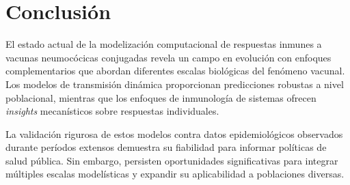 

\section{Conclusión}

El estado actual de la modelización computacional de respuestas inmunes a vacunas neumocócicas conjugadas revela un campo en evolución con enfoques complementarios que abordan diferentes escalas biológicas del fenómeno vacunal. Los modelos de transmisión dinámica proporcionan predicciones robustas a nivel poblacional, mientras que los enfoques de inmunología de sistemas ofrecen \textit{insights} mecanísticos sobre respuestas individuales.

La validación rigurosa de estos modelos contra datos epidemiológicos observados durante períodos extensos demuestra su fiabilidad para informar políticas de salud pública. Sin embargo, persisten oportunidades significativas para integrar múltiples escalas modelísticas y expandir su aplicabilidad a poblaciones diversas.





